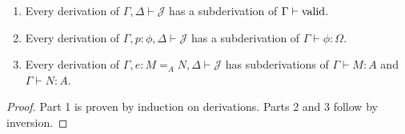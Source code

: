 \begin{lemma}
$ $
\begin{enumerate}
\item
Every derivation of $\Gamma, \Delta \vdash \mathcal{J}$ has a subderivation of $\Gamma \vdash \mathrm{valid}$.
\item
Every derivation of $\Gamma, p : \phi, \Delta \vdash \mathcal{J}$ has a subderivation of $\Gamma \vdash \phi : \Omega$.
\item
Every derivation of $\Gamma, e : M =_A N, \Delta \vdash \mathcal{J}$ has subderivations of $\Gamma \vdash M : A$ and $\Gamma \vdash N : A$.
\end{enumerate}
\end{lemma}

\begin{proof}
Part 1 is proven by induction on derivations.  Parts 2 and 3 follow by inversion.
\end{proof}

